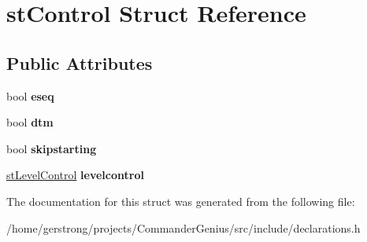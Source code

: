 \hypertarget{structst_control}{
\section{stControl Struct Reference}
\label{structst_control}
}
\subsection*{Public Attributes}
\begin{DoxyCompactItemize}
\item 
\hypertarget{structst_control_aa43cd7bcbdca02ccdfde7a29f7580a4c}{
bool {\bfseries eseq}}
\label{structst_control_aa43cd7bcbdca02ccdfde7a29f7580a4c}

\item 
\hypertarget{structst_control_a69375d80c2b71c6a9340b72ecad1163b}{
bool {\bfseries dtm}}
\label{structst_control_a69375d80c2b71c6a9340b72ecad1163b}

\item 
\hypertarget{structst_control_af8936977a9b971d519d3089e00c3b6b4}{
bool {\bfseries skipstarting}}
\label{structst_control_af8936977a9b971d519d3089e00c3b6b4}

\item 
\hypertarget{structst_control_a9583cf77ed49b57eee6d9c953f37d941}{
\hyperlink{structst_level_control}{stLevelControl} {\bfseries levelcontrol}}
\label{structst_control_a9583cf77ed49b57eee6d9c953f37d941}

\end{DoxyCompactItemize}


The documentation for this struct was generated from the following file:\begin{DoxyCompactItemize}
\item 
/home/gerstrong/projects/CommanderGenius/src/include/declarations.h\end{DoxyCompactItemize}
